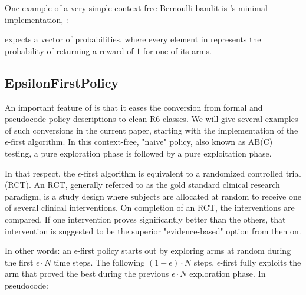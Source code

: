 \documentclass{jss}
\begin{document}
One example of a very simple context-free Bernoulli bandit is 's minimal  implementation, :


 expects a  vector of probabilities, where every element in  represents the probability of  returning a reward of $1$ for one of its  arms.

\subsection{EpsilonFirstPolicy} \label{epsfirst}

An important feature of  is that it eases the conversion from formal and pseudocode policy descriptions to clean R6 classes. We will give several examples of such conversions in the current paper, starting with the implementation of the $\epsilon$-first algorithm. In this context-free, "naive" policy, also known as AB(C) testing, a pure exploration phase is followed by a pure exploitation phase.

In that respect, the $\epsilon$-first algorithm is equivalent to a randomized controlled trial (RCT). An RCT, generally referred to as the gold standard clinical research paradigm, is a study design where subjects are allocated at random to receive one of several clinical interventions. On completion of an RCT, the interventions are compared. If one intervention proves significantly better than the others, that intervention is suggested to be the superior "evidence-based" option from then on.

In other words: an $\epsilon$-first policy starts out by exploring arms at random during the first $\epsilon \cdot N$ time steps. The following $(1-\epsilon) \cdot N$ steps, $\epsilon$-first fully exploits the arm that proved the best during the previous $\epsilon \cdot N$ exploration phase. In pseudocode:
\end{document}
